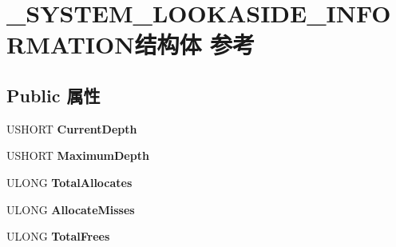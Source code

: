 \hypertarget{struct___s_y_s_t_e_m___l_o_o_k_a_s_i_d_e___i_n_f_o_r_m_a_t_i_o_n}{}\section{\+\_\+\+S\+Y\+S\+T\+E\+M\+\_\+\+L\+O\+O\+K\+A\+S\+I\+D\+E\+\_\+\+I\+N\+F\+O\+R\+M\+A\+T\+I\+O\+N结构体 参考}
\label{struct___s_y_s_t_e_m___l_o_o_k_a_s_i_d_e___i_n_f_o_r_m_a_t_i_o_n}
\subsection*{Public 属性}
\begin{DoxyCompactItemize}
\item 
\mbox{\label{struct___s_y_s_t_e_m___l_o_o_k_a_s_i_d_e___i_n_f_o_r_m_a_t_i_o_n_a5df57c2c9331b692310c8876e69df8e4}} 
U\+S\+H\+O\+RT {\bfseries Current\+Depth}
\item 
\mbox{\label{struct___s_y_s_t_e_m___l_o_o_k_a_s_i_d_e___i_n_f_o_r_m_a_t_i_o_n_abf56be9e9ec2d62b8046e27eef1533fd}} 
U\+S\+H\+O\+RT {\bfseries Maximum\+Depth}
\item 
\mbox{\label{struct___s_y_s_t_e_m___l_o_o_k_a_s_i_d_e___i_n_f_o_r_m_a_t_i_o_n_a56988c3804009a5d5bfc205e966f48ec}} 
U\+L\+O\+NG {\bfseries Total\+Allocates}
\item 
\mbox{\label{struct___s_y_s_t_e_m___l_o_o_k_a_s_i_d_e___i_n_f_o_r_m_a_t_i_o_n_acb272b32344682ee1ed66bb5575bc6fe}} 
U\+L\+O\+NG {\bfseries Allocate\+Misses}
\item 
\mbox{\label{struct___s_y_s_t_e_m___l_o_o_k_a_s_i_d_e___i_n_f_o_r_m_a_t_i_o_n_a6ee01df089921add4bce1762804afa89}} 
U\+L\+O\+NG {\bfseries Total\+Frees}
\item 
\mbox{\label{struct___s_y_s_t_e_m___l_o_o_k_a_s_i_d_e___i_n_f_o_r_m_a_t_i_o_n_a16184d68c27bc49f9ef1b838f2fbd5a7}} 

\end{DoxyCompactItemize}
